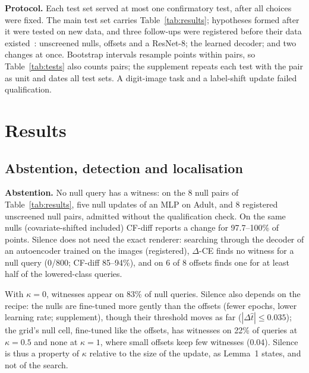 \documentclass{esannV2}
\begin{document}
\textbf{Protocol.} Each test set served at most one confirmatory test, after all choices were fixed. The main test set carries Table~\ref{tab:results}; hypotheses formed after it were tested on new data, and three follow-ups were registered before their data existed~\cite{osf}: unscreened nulls, offsets and a ResNet-8; the learned decoder; and two changes at once. Bootstrap intervals resample points within pairs, so Table~\ref{tab:tests} also counts pairs; the supplement repeats each test with the pair as unit and dates all test sets. A digit-image task and a label-shift update failed qualification.

\section{Results}



\subsection{Abstention, detection and localisation}

\textbf{Abstention.} No null query has a witness: on the 8 null pairs of Table~\ref{tab:results}, five null updates of an MLP on Adult, and 8 registered unscreened null pairs, admitted without the qualification check. On the same nulls (covariate-shifted included) CF-diff reports a change for 97.7--100\% of points. Silence does not need the exact renderer: searching through the decoder of an autoencoder trained on the images (registered), $\Delta$-CE finds no witness for a null query (0/800; CF-diff 85--94\%), and on 6 of 8 offsets finds one for at least half of the lowered-class queries.

With $\kappa=0$, witnesses appear on 83\% of null queries. Silence also depends on the recipe: the nulls are fine-tuned more gently than the offsets (fewer epochs, lower learning rate; supplement), though their threshold moves as far ($|\Delta\hat t|\le0.035$); the grid's null cell, fine-tuned like the offsets, has witnesses on 22\% of queries at $\kappa=0.5$ and none at $\kappa=1$, where small offsets keep few witnesses (0.04). Silence is thus a property of $\kappa$ relative to the size of the update, as Lemma~1 states, and not of the search.
\end{document}
